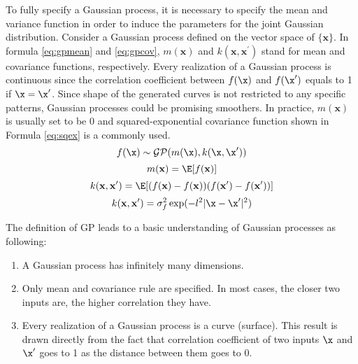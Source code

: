 To fully specify a Gaussian process, it is necessary to specify the mean and variance function in order to induce the parameters for the joint Gaussian distribution. Consider a Gaussian process defined on the vector space of $\{\mathbf{x}\}$. In formula \ref{eq:gpmean} and \ref{eq:gpcov}, $m(\mathbf{x})$ and $k(\mathbf{x},\mathbf{x}^\prime)$ stand for mean and covariance functions, respectively. Every realization of a Gaussian process is continuous since the correlation coefficient between $f(\x)$ and $f(\x^\prime)$ equals to 1 if $\x=\x^\prime$. Since shape of the generated curves is not restricted to any specific patterns, Gaussian processes could be promising smoothers. In practice, $m(\mathbf{x})$ is usually set to be 0 and squared-exponential covariance function shown in Formula \ref{eq:sqex} is a commonly used. 
\begin{equation} 
\label{eq:m3wgp}
f(\x) \sim \mathcal{G}\mathcal{P}(m(\x),k(\x,\x^\prime))
\end{equation}
\vspace{-0.5 in}
\begin{equation} \label{eq:gpmean}
m(\mathbf{x})=\E[f(\mathbf{x})]
\end{equation}
\vspace{-0.5 in}
\begin{equation} \label{eq:gpcov}
k(\mathbf{x},\mathbf{x}^\prime)=\E[(f(\mathbf{x})-f(\mathbf{x}))(f(\mathbf{x}^\prime)-f(\mathbf{x}^\prime))]
\end{equation}
\vspace{-0.5 in}
\begin{equation} \label{eq:sqex}
k(\mathbf{x},\mathbf{x}^\prime)=\sigma_f^2\exp(-l^2|\x-\x^\prime|^2)%
\end{equation}

The definition of GP leads to a basic understanding of Gaussian processes as following: 
\begin{enumerate}
	\item A Gaussian process has infinitely many dimensions.
	\item Only mean and covariance rule are specified. In most cases, the closer two inputs are, the higher correlation they have.
	\item Every realization of a Gaussian process is a curve (surface). This result is drawn directly from the fact that correlation coefficient of two inputs $\x$ and $\x^\prime$ goes to 1 as the distance between them goes to 0. 
\end{enumerate}

